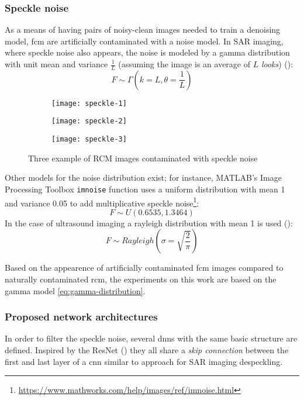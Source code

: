 \documentclass[../main.tex]{subfiles}
\begin{document}
\subsubsection{Speckle noise}
As a means of having pairs of noisy-clean images needed to train a denoising
model, \gls{fcm} are artificially contaminated with a noise model.
In SAR imaging, where speckle noise also appears, the noise is modeled by
a gamma distribution with unit mean and variance $\frac{1}{L}$ (assuming
the image is an average of $L$ \emph{looks})
(\cite{GammaSpeckle}):
\begin{equation}\label{eq:gamma-distribution}
F \sim \Gamma(k = L, \theta = \frac{1}{L})
\end{equation}

\begin{figure}[h]
\centering
\begin{subfigure}{.3\textwidth}
  \centering
  \texttt{[image: speckle-1]}
\end{subfigure}%
\begin{subfigure}{.3\textwidth}
  \centering
  \texttt{[image: speckle-2]}
\end{subfigure}%
\begin{subfigure}{.3\textwidth}
  \centering
  \texttt{[image: speckle-3]}
\end{subfigure}
\caption{Three example of RCM images contaminated with speckle noise}
\label{fig:speckle}
\end{figure}

Other models for the noise distribution exist; for instance, MATLAB's
Image Processing Toolbox \verb|imnoise| function uses a uniform distribution
with mean 1 and variance 0.05 to add multiplicative speckle noise\footnote{
\url{https://www.mathworks.com/help/images/ref/imnoise.html}}:
\begin{equation}
F \sim U(0.6535,1.3464)
\end{equation}
In the case of ultrasound imaging a rayleigh distribution with mean 1 is used
(\cite{RayleighSpeckle}):
\begin{equation}
F \sim Rayleigh(\sigma=\sqrt{\frac{2}{\pi}})
\end{equation}

Based on the appearence of artificially contaminated \gls{fcm} images compared to
naturally contaminated \gls{rcm}, the experiments on this work are based on the
gamma model \eqref{eq:gamma-distribution}.

\subsubsection{Proposed network architectures}
In order to filter the speckle noise, several \glspl{dnn} with the same basic
structure are defined. Inspired by the ResNet (\cite{he2015deep}) they all share a
\emph{skip connection} between the first and last layer of a \gls{cnn} similar to
\cite{Wang2018} approach for SAR imaging despeckling.
\end{document}
